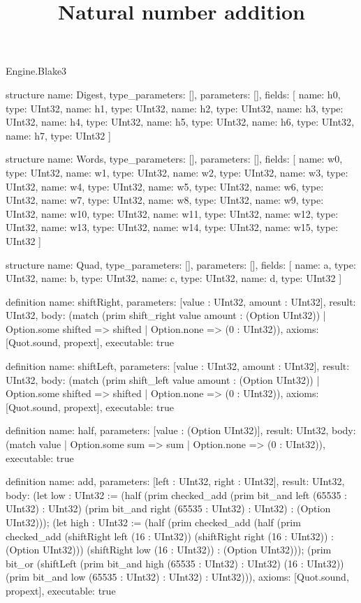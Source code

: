 \begin{lexlean}{Engine.Blake3}
\title{Natural number addition}
\begin{semanticmodule}
structure{
  name: Digest,
  type_parameters: [],
  parameters: [],
  fields: [
    {name: h0, type: UInt32},
    {name: h1, type: UInt32},
    {name: h2, type: UInt32},
    {name: h3, type: UInt32},
    {name: h4, type: UInt32},
    {name: h5, type: UInt32},
    {name: h6, type: UInt32},
    {name: h7, type: UInt32}
  ]
}

structure{
  name: Words,
  type_parameters: [],
  parameters: [],
  fields: [
    {name: w0, type: UInt32},
    {name: w1, type: UInt32},
    {name: w2, type: UInt32},
    {name: w3, type: UInt32},
    {name: w4, type: UInt32},
    {name: w5, type: UInt32},
    {name: w6, type: UInt32},
    {name: w7, type: UInt32},
    {name: w8, type: UInt32},
    {name: w9, type: UInt32},
    {name: w10, type: UInt32},
    {name: w11, type: UInt32},
    {name: w12, type: UInt32},
    {name: w13, type: UInt32},
    {name: w14, type: UInt32},
    {name: w15, type: UInt32}
  ]
}

structure{
  name: Quad,
  type_parameters: [],
  parameters: [],
  fields: [
    {name: a, type: UInt32},
    {name: b, type: UInt32},
    {name: c, type: UInt32},
    {name: d, type: UInt32}
  ]
}

definition{
  name: shiftRight,
  parameters: [value : UInt32, amount : UInt32],
  result: UInt32,
  body: (match (prim shift_right value amount : (Option UInt32))
    | Option.some shifted => shifted
    | Option.none => (0 : UInt32)),
  axioms: [Quot.sound, propext],
  executable: true
}

definition{
  name: shiftLeft,
  parameters: [value : UInt32, amount : UInt32],
  result: UInt32,
  body: (match (prim shift_left value amount : (Option UInt32))
    | Option.some shifted => shifted
    | Option.none => (0 : UInt32)),
  axioms: [Quot.sound, propext],
  executable: true
}

definition{
  name: half,
  parameters: [value : (Option UInt32)],
  result: UInt32,
  body: (match value | Option.some sum => sum | Option.none => (0 : UInt32)),
  executable: true
}

definition{
  name: add,
  parameters: [left : UInt32, right : UInt32],
  result: UInt32,
  body: (let low : UInt32 := (half (prim checked_add (prim bit_and left (65535 : UInt32) : UInt32) (prim bit_and right (65535 : UInt32) : UInt32) : (Option UInt32))); (let high : UInt32 := (half (prim checked_add (half (prim checked_add (shiftRight left (16 : UInt32)) (shiftRight right (16 : UInt32)) : (Option UInt32))) (shiftRight low (16 : UInt32)) : (Option UInt32))); (prim bit_or (shiftLeft (prim bit_and high (65535 : UInt32) : UInt32) (16 : UInt32)) (prim bit_and low (65535 : UInt32) : UInt32) : UInt32))),
  axioms: [Quot.sound, propext],
  executable: true
}


\end{semanticmodule}
\end{lexlean}
